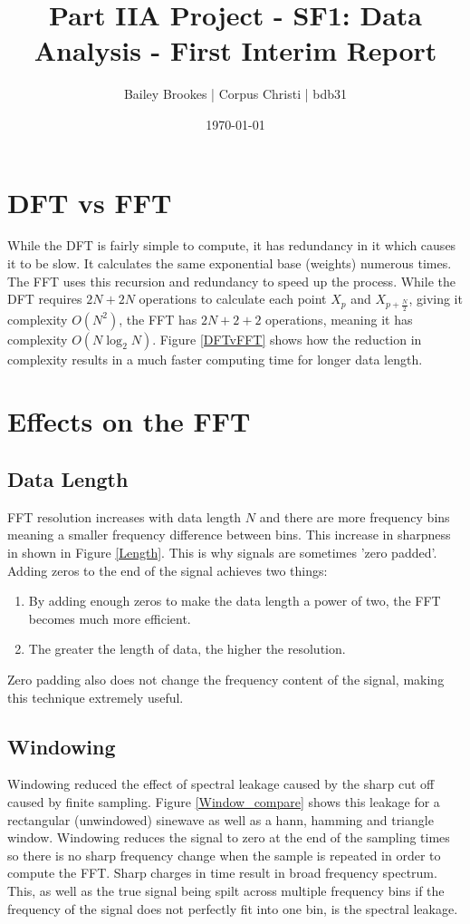 \documentclass[10.9pt]{article}
\title{Part IIA Project - SF1: Data Analysis - First Interim Report}
\author{Bailey Brookes | Corpus Christi | bdb31}
\date{\today}
\begin{document}
\maketitle

\section{DFT vs FFT}
While the DFT is fairly simple to compute, it has redundancy in it which causes it to be slow. It calculates the same exponential base (weights) numerous times. The FFT uses this recursion and redundancy to speed up the process. While the DFT requires $2N + 2N$ operations to calculate each point $X_p$ and $X_{p+\frac{N}{2}}$, giving it complexity $O(N^2)$, the FFT has $2N + 2+2$ operations, meaning it has complexity $O(N\log_2N)$. Figure \ref{DFTvFFT} shows how the reduction in complexity results in a much faster computing time for longer data length.

\section{Effects on the FFT}
\subsection{Data Length}
FFT resolution increases with data length $N$ and there are more frequency bins meaning a smaller frequency difference between bins. This increase in sharpness in shown in Figure \ref{Length}. This is why signals are sometimes 'zero padded'. Adding zeros to the end of the signal achieves two things:
\begin{enumerate}
	\item By adding enough zeros to make the data length a power of two, the FFT becomes much more efficient.
	\item The greater the length of data, the higher the resolution.
\end{enumerate}
Zero padding also does not change the frequency content of the signal, making this technique extremely useful.

\subsection{Windowing}
Windowing reduced the effect of spectral leakage caused by the sharp cut off caused by finite sampling. Figure \ref{Window_compare} shows this leakage for a rectangular (unwindowed) sinewave as well as a hann, hamming and triangle window. Windowing reduces the signal to zero at the end of the sampling times so there is no sharp frequency change when the sample is repeated in order to compute the FFT. Sharp charges in time result in broad frequency spectrum. This, as well as the true signal being spilt across multiple frequency bins if the frequency of the signal does not perfectly fit into one bin, is the spectral leakage.
\end{document}
